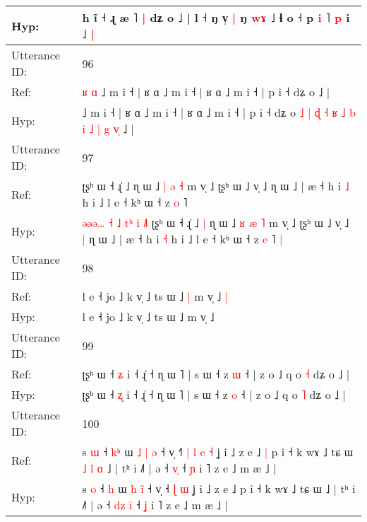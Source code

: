\documentclass[10pt]{article}
\DeclareRobustCommand{\hl}[1]{{\textcolor{red}{#1}}}
\begin{document}
\begin{longtable}{ll}
 \\
Hyp: & h ĩ ˧ ɻ æ ˥\hl{ }\hl{|} dʑ o ˩ | l\hl{}\hl{} ˧ ŋ v̩ \hl{|} ŋ \hl{w}\hl{ɤ} ˩\hl{}\hl{} ɬ o ˧ p \hl{}\hl{i} ˥ \hl{p} i ˩\hl{ }\hl{|}
 \\
\midrule
Utterance ID: & 96 \\
Ref: & \hl{ʁ}\hl{ }\hl{ɑ}\hl{ }˩ m i ˧ | ʁ ɑ ˩ m i ˧ | ʁ ɑ ˩ m i ˧ | p i ˧ dʑ o\hl{}\hl{}\hl{}\hl{}\hl{}\hl{}\hl{}\hl{}\hl{}\hl{}\hl{}\hl{}\hl{}\hl{}\hl{}\hl{}\hl{}\hl{}\hl{}\hl{}\hl{}\hl{}\hl{}\hl{}\hl{} ˩ |
 \\
Hyp: & \hl{}\hl{}\hl{}\hl{}˩ m i ˧ | ʁ ɑ ˩ m i ˧ | ʁ ɑ ˩ m i ˧ | p i ˧ dʑ o\hl{ }\hl{˩}\hl{ }\hl{|}\hl{ }\hl{ɖ}\hl{ }\hl{˧}\hl{ }\hl{ʁ}\hl{ }\hl{˩}\hl{ }\hl{b}\hl{ }\hl{i}\hl{ }\hl{˩}\hl{ }\hl{|}\hl{ }\hl{g}\hl{ }\hl{v}\hl{̩} ˩ |
 \\
\midrule
Utterance ID: & 97 \\
Ref: & \hl{}\hl{}\hl{}\hl{}\hl{}\hl{}\hl{}\hl{}\hl{}\hl{}\hl{}\hl{}\hl{}\hl{}\hl{}\hl{}\hl{}ʈʂʰ ɯ ˧ ɻ̍ ˩\hl{}\hl{} ɳ ɯ ˩ \hl{|} \hl{ə} \hl{˧} m v̩ ˩ ʈʂʰ ɯ ˩ v̩ ˩\hl{}\hl{} ɳ ɯ ˩ | æ ˧ h i \hl{˩} h i ˩ l e ˧ kʰ ɯ ˧ z \hl{o} ˥\hl{}\hl{}
 \\
Hyp: & \hl{ə}\hl{ə}\hl{ə}\hl{…}\hl{ }\hl{˧}\hl{ }\hl{˩}\hl{ }\hl{t}\hl{ʰ}\hl{ }\hl{i}\hl{ }\hl{˩}\hl{˥}\hl{ }ʈʂʰ ɯ ˧ ɻ̍ ˩\hl{ }\hl{|} ɳ ɯ ˩ \hl{ʁ} \hl{æ} \hl{˥} m v̩ ˩ ʈʂʰ ɯ ˩ v̩ ˩\hl{ }\hl{|} ɳ ɯ ˩ | æ ˧ h i \hl{˧} h i ˩ l e ˧ kʰ ɯ ˧ z \hl{e} ˥\hl{ }\hl{|}
 \\
\midrule
Utterance ID: & 98 \\
Ref: & l e ˧ jo ˩ k v̩ ˩ ts ɯ ˩\hl{ }\hl{|} m v̩ ˩\hl{ }\hl{|}
 \\
Hyp: & l e ˧ jo ˩ k v̩ ˩ ts ɯ ˩\hl{}\hl{} m v̩ ˩\hl{}\hl{}
 \\
\midrule
Utterance ID: & 99 \\
Ref: & ʈʂʰ ɯ ˧ \hl{ʑ} i ˧ ɻ̍ ˧ ɳ ɯ ˥ | s ɯ ˧ z \hl{ɯ} ˧ | z o ˩ q o \hl{˧} dʑ o ˩ |
 \\
Hyp: & ʈʂʰ ɯ ˧ \hl{ʐ} i ˧ ɻ̍ ˧ ɳ ɯ ˥ | s ɯ ˧ z \hl{o} ˧ | z o ˩ q o \hl{˥} dʑ o ˩ |
 \\
\midrule
Utterance ID: & 100 \\
Ref: & s \hl{ɯ} ˧ \hl{k}\hl{ʰ} ɯ \hl{˩} \hl{|}\hl{ }\hl{ə} ˧ v̩ ˧\hl{˥}\hl{ }\hl{|}\hl{ }\hl{l} \hl{e} \hl{˧} ʝ i ˩ z e ˩\hl{ }\hl{|} p i ˧ k wɤ ˩ tɕ ɯ\hl{ }\hl{˩}\hl{ }\hl{l}\hl{ }\hl{ɑ} ˩ | tʰ i ˩˥ | ə ˧ \hl{}\hl{}\hl{v}\hl{̩} ˧ \hl{ɲ} i ˥ z e ˩ m æ ˩ |
 \\
Hyp: & s \hl{o} ˧ \hl{}\hl{h} ɯ \hl{h} \hl{}\hl{i}\hl{̃} ˧ v̩ ˧\hl{}\hl{}\hl{}\hl{}\hl{} \hl{ɭ} \hl{ɯ} ʝ i ˩ z e ˩\hl{}\hl{} p i ˧ k wɤ ˩ tɕ ɯ\hl{}\hl{}\hl{}\hl{}\hl{}\hl{} ˩ | tʰ i ˩˥ | ə ˧ \hl{d}\hl{z}\hl{ }\hl{i} ˧ \hl{ʝ} i ˥ z e ˩ m æ ˩ |

\end{longtable}
\end{document}
